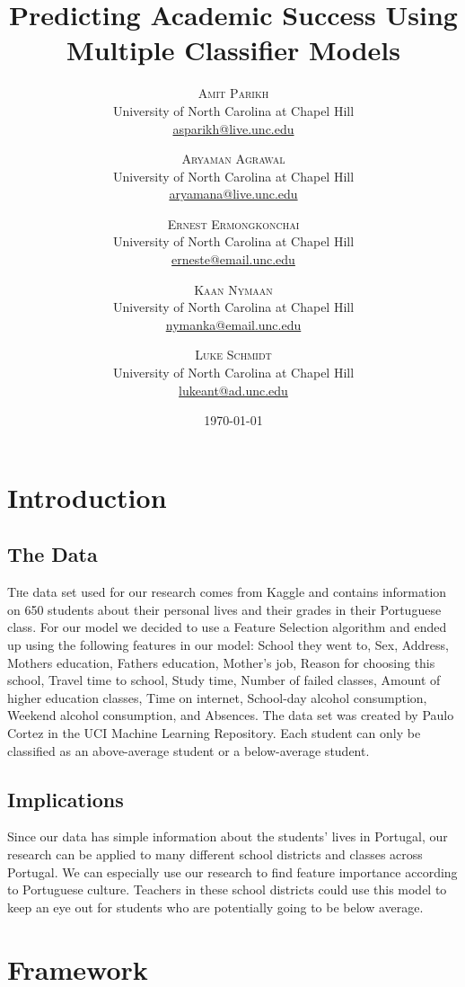\documentclass[twoside,twocolumn]{article}
\title{Predicting Academic Success Using Multiple Classifier Models} %
\author{%
\textsc{Amit Parikh} \\[1ex] %
\normalsize University of North Carolina at Chapel Hill \\ %
\normalsize \href{mailto:john@smith.com}{asparikh@live.unc.edu} %
\and %
\textsc{Aryaman Agrawal} \\[1ex] %
\normalsize University of North Carolina at Chapel Hill \\ %
\normalsize \href{mailto:john@smith.com}{aryamana@live.unc.edu} %
\and %
\textsc{Ernest Ermongkonchai} \\[1ex] %
\normalsize University of North Carolina at Chapel Hill \\ %
\normalsize \href{mailto:jane@smith.com}{erneste@email.unc.edu} %
\and %
\textsc{Kaan Nymaan} \\[1ex] %
\normalsize University of North Carolina at Chapel Hill \\ %
\normalsize \href{mailto:jane@smith.com}{nymanka@email.unc.edu} %
\and %
\textsc{Luke Schmidt} \\[1ex] %
\normalsize University of North Carolina at Chapel Hill \\ %
\normalsize \href{mailto:jane@smith.com}{lukeant@ad.unc.edu} %
}
\date{\today} %
\begin{document}
\maketitle


\section{Introduction}
\subsection{The Data}
\lettrine[nindent=0em,lines=3] {T}he data set used for our research comes from Kaggle and contains information on 650 students about their personal lives and their grades in their Portuguese class. For our model we decided to use a Feature Selection algorithm and ended up using the following features in our model: School they went to, Sex, Address, Mothers education, Fathers education, Mother’s job, Reason for choosing this school, Travel time to school, Study time, Number of failed classes, Amount of higher education classes, Time on internet, School-day alcohol consumption, Weekend alcohol consumption, and Absences. The data set was created by Paulo Cortez in the UCI Machine Learning Repository. Each student can only be classified as an above-average student or a below-average student.
\subsection{Implications}
Since our data has simple information about the students' lives in Portugal, our research can be applied to many different school districts and classes across Portugal. We can especially use our research to find feature importance according to Portuguese culture. Teachers in these school districts could use this model to keep an eye out for students who are potentially going to be below average.


\section{Framework}
\end{document}
